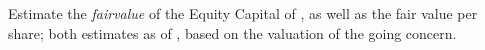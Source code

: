 Estimate the \textit{\gls{fairvalue}} of the Equity Capital of  \textcolor{principal}{\empresaSolicitante}, as well as the fair value per share; both estimates as of \textcolor{principal}{\fechaValores}, based on the valuation of the going concern.